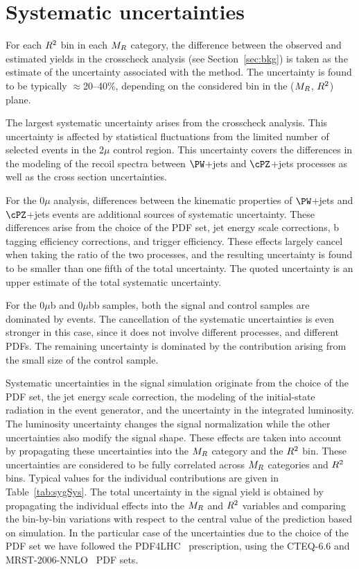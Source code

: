 \section{Systematic uncertainties}\label{sec:sys}

For each $R^2$ bin in each $M_R$ category, the
difference between the observed and estimated yields in the
crosscheck analysis (see Section~\ref{sec:bkg}) is taken as the estimate of the uncertainty associated with the
method. The uncertainty is found to
be typically ${\approx}$20--40\%, depending on the considered bin in the
($M_R$, $R^2$) plane.

The largest systematic uncertainty arises from the crosscheck
analysis. This uncertainty is affected by statistical
fluctuations from the limited number of selected events in the 2$\mu$
control region. This uncertainty covers the differences
in the modeling of the recoil spectra between $\PW$+jets and $\cPZ$+jets processes as well as
the cross section uncertainties.

For the 0$\mu$ analysis, differences between the kinematic properties of $\PW$+jets and
$\cPZ$+jets events are additional sources of systematic uncertainty. These
differences arise from the choice of the PDF set, jet energy scale
corrections, b tagging efficiency
corrections, and trigger efficiency. These effects largely cancel when taking the ratio of the two processes, and the resulting
uncertainty is found to be smaller than one fifth
of the total uncertainty.  The quoted uncertainty is an upper
estimate of the total systematic uncertainty.

For the 0$\mu$b and 0$\mu$bb samples, both the signal and control samples are dominated by \ttbar events. The cancellation of the
systematic uncertainties is even stronger in
this case, since it does not involve different processes, and different
PDFs. The remaining uncertainty is
dominated by the contribution arising from the small size of the control
sample.

Systematic uncertainties in the signal simulation
originate from the choice of the PDF set,
the jet energy scale correction, the modeling of the initial-state radiation in the event
generator, and the uncertainty in the integrated luminosity. The
luminosity uncertainty changes the signal normalization while the other
uncertainties also modify the signal shape.
These effects are taken into account by propagating these
uncertainties into the $M_R$ category and the $R^2$ bin. These uncertainties are
considered to be fully correlated across $M_R$ categories and
$R^2$ bins. Typical values for the individual contributions
are given in Table~\ref{tab:sygSys}. The total uncertainty in the
signal yield is obtained by propagating the individual effects into
the $M_R$ and $R^2$ variables and comparing the bin-by-bin variations with respect to the central value of the prediction
based on simulation. In the particular case of the uncertainties due
to the choice of the PDF set we have followed the PDF4LHC~\cite{Bourilkov:2006cj,Alekhin:2011sk,Botje:2011sn} prescription, using the CTEQ-6.6\cite{Nadolsky:2008zw} and MRST-2006-NNLO~\cite{Martin:2007bv} PDF sets.

